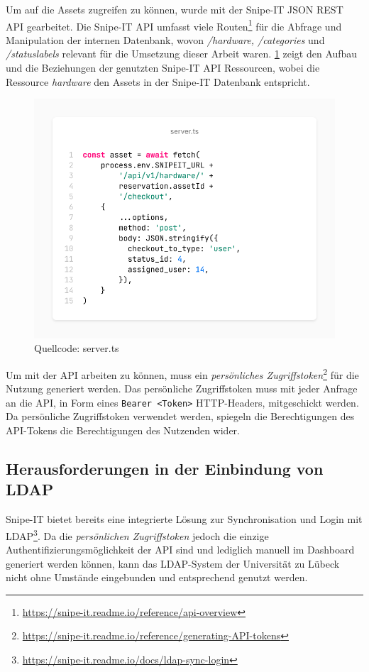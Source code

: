 Um auf die Assets zugreifen zu können, wurde mit der Snipe-IT JSON REST API gearbeitet. Die Snipe-IT
API umfasst viele Routen\footnote{\url{https://snipe-it.readme.io/reference/api-overview}} für die
Abfrage und Manipulation der internen Datenbank, wovon \textit{/hardware, /categories} und
\textit{/statuslabels} relevant für die Umsetzung dieser Arbeit waren. \ref{fig:snipe} zeigt den
Aufbau und die Beziehungen der genutzten Snipe-IT API Ressourcen, wobei die Ressource
\textit{hardware} den Assets in der Snipe-IT Datenbank entspricht.

\begin{figure}[h]
  \centering
  \includegraphics[scale=0.4]{Bilder/screenshot(5).png}
  \caption[Quellcode: server.ts]{Quellcode: server.ts}
  \label{fig:snipe}
\end{figure}

Um mit der API arbeiten zu können, muss ein \textit{persönliches
  Zugriffstoken}\footnote{\url{https://snipe-it.readme.io/reference/generating-API-tokens}} für die
  Nutzung generiert werden. Das persönliche Zugriffstoken muss mit jeder Anfrage an die API, in Form
  eines \lstinline{Bearer <Token>} HTTP-Headers, mitgeschickt werden. Da persönliche Zugriffstoken
  verwendet werden, spiegeln die Berechtigungen des API-Tokens die Berechtigungen des Nutzenden
  wider. 

\subsection{Herausforderungen in der Einbindung von LDAP}
Snipe-IT bietet bereits eine integrierte Lösung zur Synchronisation und Login mit
LDAP\footnote{\url{https://snipe-it.readme.io/docs/ldap-sync-login}}. Da die \textit{persönlichen
Zugriffstoken} jedoch die einzige Authentifizierungsmöglichkeit der API sind und lediglich manuell
im Dashboard generiert werden können, kann das LDAP-System der Universität zu Lübeck nicht ohne
Umstände eingebunden und entsprechend genutzt werden. 


